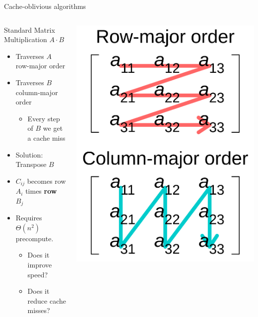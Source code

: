 \documentclass[compress,aspectratio=169]{beamer}
\begin{document}
\begin{frame}{Cache-oblivious algorithms \cite{frigo}}
  \begin{columns}
    \begin{column}{0.5\textwidth}
      Standard Matrix Multiplication $A \cdot B$
      \begin{itemize}
        \item Traverses $A$ row-major order
        \item Traverses $B$ column-major order
          \begin{itemize}
            \item Every step of $B$ we get a cache miss
          \end{itemize}
        \item Solution: Transpose $B$
        \item $C_{ij}$ becomes row $A_i$ times \textbf{row} $B_j$
        \item Requires $\Theta(n^2)$ precompute.
          \begin{itemize}
            \item Does it improve speed?
            \item Does it reduce cache misses?
          \end{itemize}
      \end{itemize}
    \end{column}
    \begin{column}{0.5\textwidth}
      \includegraphics[height=0.9\textheight]{../assets/Row_and_column_major_order.svg.png}

\end{column}
\end{columns}
\end{frame}
\end{document}
